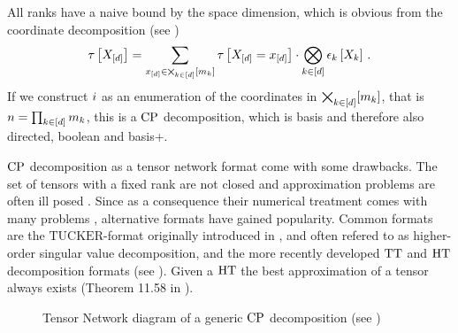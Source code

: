 All ranks have a naive bound by the space dimension, which is obvious from the coordinate decomposition (see )
\begin{align*}
    \tau\left[X_{[d]}\right]
    = \sum_{x_{[d]}\in\bigtimes_{k\in[d]}[m_{k}]} \tau\left[X_{[d]}=x_{[d]}\right] \cdot \bigotimes_{k\in[d]} \epsilon_{k}\left[X_{k}\right] \, .
\end{align*}
If we construct $i$ as an enumeration of the coordinates in $\bigtimes_{k\in[d]}[m_{k}]$, that is $n=\prod_{k\in[d]}m_{k}$, this is a $\mathrm{CP}$ decomposition, which is basis and therefore also directed, boolean and basis+.

%
$\mathrm{CP}$ decomposition as a tensor network format come with some drawbacks.
The set of tensors with a fixed rank are not closed \cite{beylkin_algorithms_2005} and approximation problems are often ill posed \cite{de_silva_tensor_2008}.
Since as a consequence their numerical treatment comes with many problems \cite{espig_variational_2012}, alternative formats have gained popularity.
Common formats are the $\mathrm{TUCKER}$-format originally introduced in \cite{hitchcock_expression_1927}, and often refered to as higher-order singular value decomposition, and the more recently developed $\mathrm{TT}$ and $\mathrm{HT}$ decomposition formats (see ).
Given a $\mathrm{HT}$ the best approximation of a tensor always exists (Theorem 11.58 in \cite{hackbusch_tensor_2012}).



\begin{figure}[h]
    \begin{center}
        
    \end{center}
    \caption{Tensor Network diagram of a generic $\mathrm{CP}$ decomposition (see )}
\end{figure}



